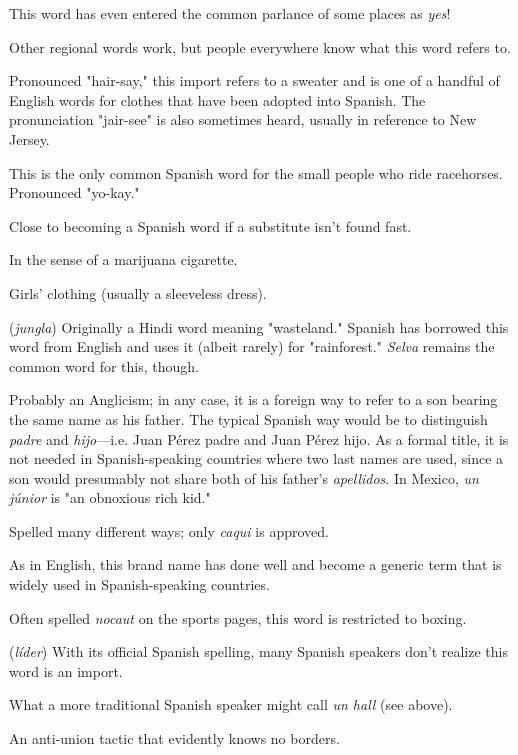 This word has even entered the common parlance of
some places as \emph{yes}!

 Other regional words work, but people everywhere
know what this word refers to.

 Pronounced "hair-say," this import refers to a
sweater and is one of a handful of English words for clothes that
have been adopted into Spanish. The pronunciation "jair-see" is also
sometimes heard, usually in reference to New Jersey.

 This is the only common Spanish word for the
small people who ride racehorses. Pronounced "yo-kay."

 Close to becoming a Spanish word if a substitute
isn't found fast.

 In the sense of a marijuana cigarette.

 Girls' clothing (usually a sleeveless dress).

 (\emph{jungla}) Originally a Hindi word meaning "wasteland." Spanish has borrowed this word from English and uses it (albeit
rarely) for "rainforest." \emph{Selva} remains the common word for this, though.

 Probably an Anglicism; in any case, it is a foreign
way to refer to a son bearing the same name as his father. The typical
Spanish way would be to distinguish \emph{padre} and \emph{hijo}---i.e. Juan Pérez
padre and Juan Pérez hijo. As a formal title, it is not needed in Spanish-speaking countries where two last names are used, since a son would
presumably not share both of his father's \emph{apellidos}. In Mexico, \emph{un júnior} is "an obnoxious rich kid."

 Spelled many different ways; only \emph{caqui} is approved.

 As in English, this brand name has done well
and become a generic term that is widely used in Spanish-speaking
countries.

 Often spelled \emph{nocaut} on the sports pages, this
word is restricted to boxing.

 (\emph{líder}) With its official Spanish spelling, many Spanish speakers don't realize this word is an import.

 What a more traditional Spanish speaker might call
\emph{un hall} (see above).

 An anti-union tactic that evidently knows no
borders.

